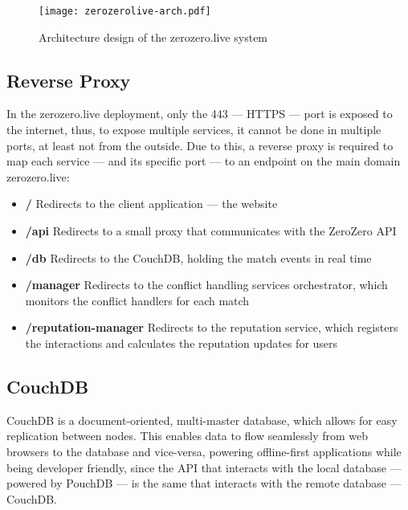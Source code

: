 \begin{figure}[t]
    \begin{center}
        \leavevmode
        \texttt{[image: zerozerolive-arch.pdf]}
        \caption{Architecture design of the zerozero.live system}
        \label{fig:services-arch}
    \end{center}
\end{figure}

\subsection{Reverse Proxy}

In the zerozero.live deployment, only the 443 --- HTTPS --- port is exposed to the internet, thus, to expose multiple services, it cannot be done in multiple ports, at least not from the outside. Due to this, a reverse proxy is required to map each service --- and its specific port --- to an endpoint on the main domain zerozero.live:
 
\begin{itemize}
    \item \textbf{/} Redirects to the client application --- the website
    \item \textbf{/api} Redirects to a small proxy that communicates with the ZeroZero API
    \item \textbf{/db} Redirects to the CouchDB, holding the match events in real time
    \item \textbf{/manager} Redirects to the conflict handling services orchestrator, which monitors the conflict handlers for each match
    \item \textbf{/reputation-manager} Redirects to the reputation service, which registers the interactions and calculates the reputation updates for users 
\end{itemize}

\subsection{CouchDB}

CouchDB is a document-oriented, multi-master database, which allows for easy replication between nodes. This enables data to flow seamlessly from web browsers to the database and vice-versa, powering offline-first applications while being developer friendly, since the API that interacts with the local database --- powered by PouchDB --- is the same that interacts with the remote database --- CouchDB.

